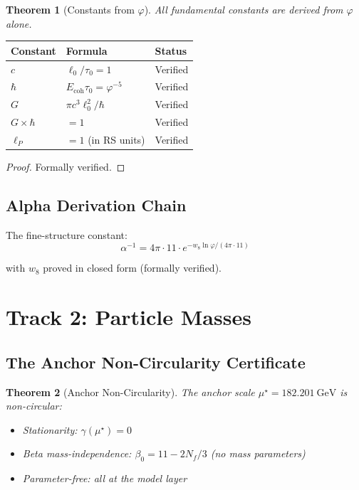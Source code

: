 \documentclass[12pt,a4paper]{article}
\newtheorem{theorem}{Theorem}[section]
\theoremstyle{definition}
\theoremstyle{remark}
\begin{document}
\begin{theorem}[Constants from $\varphi$]
All fundamental constants are derived from $\varphi$ alone.
\end{theorem}

\begin{center}
\begin{tabular}{lll}
\hline
Constant & Formula & Status \\
\hline
$c$ & $\ell_0/\tau_0 = 1$ & Verified \\
$\hbar$ & $E_\mathrm{coh}\tau_0 = \varphi^{-5}$ & Verified \\
$G$ & $\pi c^3\ell_0^2/\hbar$ & Verified \\
$G \times \hbar$ & $= 1$ & Verified \\
$\ell_P$ & $= 1$ (in RS units) & Verified \\
\hline
\end{tabular}
\end{center}

\begin{proof}
Formally verified.
\end{proof}

\subsection{Alpha Derivation Chain}

The fine-structure constant:
\begin{equation}
\alpha^{-1} = 4\pi \cdot 11 \cdot e^{-w_8 \ln\varphi / (4\pi\cdot 11)}
\end{equation}

with $w_8$ proved in closed form (formally verified).

\section{Track 2: Particle Masses}

\subsection{The Anchor Non-Circularity Certificate}

\begin{theorem}[Anchor Non-Circularity]
The anchor scale $\mu^\star = 182.201~\text{GeV}$ is non-circular:
\begin{itemize}
\item Stationarity: $\gamma(\mu^\star) = 0$
\item Beta mass-independence: $\beta_0 = 11 - 2N_f/3$ (no mass parameters)
\item Parameter-free: all at the model layer
\end{itemize}
\end{theorem}
\end{document}
